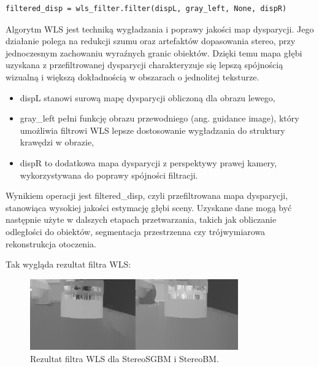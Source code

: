 \documentclass[magisterska]{pracadypl}
\begin{document}
\begin{lstlisting}[style=mypython]
filtered_disp = wls_filter.filter(dispL, gray_left, None, dispR)
\end{lstlisting}

Algorytm WLS jest techniką wygładzania i poprawy jakości map dysparycji. Jego działanie polega na redukcji szumu oraz artefaktów dopasowania stereo, przy jednoczesnym zachowaniu wyraźnych granic obiektów. Dzięki temu mapa głębi uzyskana z przefiltrowanej dysparycji charakteryzuje się lepszą spójnością wizualną i większą dokładnością w obszarach o jednolitej teksturze.

\begin{itemize}
  \item dispL stanowi surową mapę dysparycji obliczoną dla obrazu lewego,
  \item gray\_left pełni funkcję obrazu przewodniego (ang. guidance image), który umożliwia filtrowi WLS lepsze dostosowanie wygładzania do struktury krawędzi w obrazie,
  \item dispR to dodatkowa mapa dysparycji z perspektywy prawej kamery, wykorzystywana do poprawy spójności filtracji.
\end{itemize}

Wynikiem operacji jest filtered\_disp, czyli przefiltrowana mapa dysparycji, stanowiąca wysokiej jakości estymację głębi sceny. Uzyskane dane mogą być następnie użyte w dalszych etapach przetwarzania, takich jak obliczanie odległości do obiektów, segmentacja przestrzenna czy trójwymiarowa rekonstrukcja otoczenia.

Tak wygląda rezultat filtra WLS:

\begin{figure}[H]  %
    \centering  %
    \includegraphics[width=0.8\textwidth]{images/combinedWLS.png}  %
    \captionsetup{font=footnotesize}
    \caption[Rezultat filtra WLS dla StereoSGBM i StereoBM. Opracowanie własne.]{Rezultat filtra WLS dla StereoSGBM i StereoBM.}
\end{figure}
\end{document}
